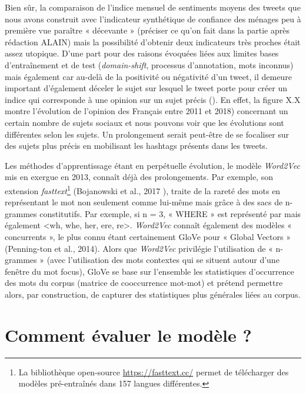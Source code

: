 \documentclass[11pt,french,french]{article}
\let\rmarkdownfootnote\footnote%
\def\footnote{\protect\rmarkdownfootnote}
\begin{document}
Bien sûr, la comparaison de l'indice mensuel de sentiments moyens des tweets que nous avons construit avec l'indicateur synthétique de confiance des ménages peu à première vue paraître « décevante » \colorbox{BurntOrange}{(préciser ce qu’on fait dans la partie après rédaction ALAIN)} mais la possibilité d'obtenir deux indicateurs très proches était assez utopique. D'une part pour des raisons évoquées liées aux limites bases d'entraînement et de test (\emph{domain-shift}, processus d'annotation, mots inconnus) mais également car au-delà de la positivité ou négativité d'un tweet, il demeure important d'également déceler le sujet sur lesquel le tweet porte pour créer un indice qui corresponde à une opinion sur un sujet précis (). En effet, la figure X.X montre l'évolution de l'opinion des Français entre 2011 et 2018) concernant un certain nombre de sujets sociaux et nous pouvons voir que les évolutions sont différentes selon les sujets. Un prolongement serait peut-être de se focaliser sur des sujets plus précis en mobilisant les hashtags présents dans les tweets.

Les méthodes d'apprentissage étant en perpétuelle évolution, le modèle \emph{Word2Vec} mis en exergue en 2013, connaît déjà des prolongements. Par exemple, son extension \emph{fasttext}\footnote{La bibliothèque open-source \url{https://fasttext.cc/} permet de télécharger des modèles pré-entraînés dans 157 langues différentes.} (Bojanowski et al., 2017 ), traite de la rareté des mots en représentant le mot non seulement comme lui-même mais grâce à des sacs de n-grammes constitutifs. Par exemple, si n = 3, « WHERE » est représenté par mais également \textless{}wh, whe, her, ere, re\textgreater{}. \emph{Word2Vec} connaît également des modèles « concurrents », le plus connu étant certainement GloVe pour « Global Vectors » (Penning-ton et al., 2014). Alors que \emph{Word2Vec} privilégie l'utilisation de « n-grammes » (avec l'utilisation des mots contextes qui se situent autour d'une fenêtre du mot focus), GloVe se base sur l'ensemble les statistiques d'occurrence des mots du corpus (matrice de cooccurrence mot-mot) et prétend permettre alors, par construction, de capturer des statistiques plus générales liées au corpus.

\newpage

\hypertarget{appendix-appendix}{%
\appendix}


\hypertarget{annexe:commentEvaluer}{%
\section{Comment évaluer le modèle ?}\label{annexe:commentEvaluer}}
\end{document}
